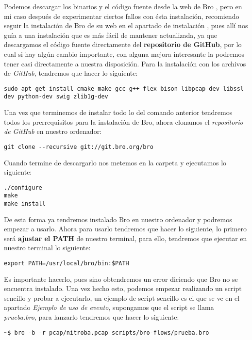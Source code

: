Podemos descargar los binarios y el código fuente desde la web de Bro \cite{brodownload}, 
pero en mi caso después de experimentar ciertos fallos con ésta instalación, 
recomiendo seguir la instalación de Bro de su web en el apartado de instalación \cite{broinstall}, 
pues allí nos guía a una instalación que es más fácil de mantener actualizada, 
ya que descargamos el código fuente directamente del \textbf{repositorio de GitHub}, 
por lo cual si hay algún cambio importante, con alguna mejora interesante 
la podremos tener casi directamente a nuestra disposición.
\intro
Para la instalación con los archivos de \textit{GitHub}, tendremos que hacer lo siguiente:
\intro
\begin{lstlisting}[style=Consola]
sudo apt-get install cmake make gcc g++ flex bison libpcap-dev libssl-dev python-dev swig zlib1g-dev
\end{lstlisting}

\noindent Una vez que terminemos de instalar todo lo del comando anterior tendremos todos los 
prerrequisitos para la instalación de Bro, ahora clonamos el 
\textit{repositorio de GitHub} en nuestro ordenador:
\intro
\begin{lstlisting}[style=Consola]
git clone --recursive git://git.bro.org/bro
\end{lstlisting}

\noindent Cuando termine de descargarlo nos metemos en la carpeta y ejecutamos lo siguiente:
\intro
\begin{lstlisting}[style=Consola]
./configure
make
make install
\end{lstlisting}

\noindent De esta forma ya tendremos instalado Bro en nuestro ordenador y podremos empezar 
a usarlo.
\intro
Ahora para usarlo tendremos que hacer lo siguiente, lo primero será \textbf{ajustar el 
PATH} de nuestro terminal, para ello, tendremos que ejecutar en nuestro terminal 
lo siguiente:
\intro
\begin{lstlisting}[style=Consola]
export PATH=/usr/local/bro/bin:$PATH
\end{lstlisting}

\noindent Es importante hacerlo, pues sino obtendremos un error diciendo que Bro no se 
encuentra instalado. Una vez hecho esto, podemos empezar realizando un script 
sencillo y probar a ejecutarlo, un ejemplo de script sencillo es el que se ve 
en el apartado \textit{Ejemplo  de uso de evento}, 
supongamos que el script se llama \textit{prueba.bro}, para lanzarlo tendremos 
que hacer lo siguiente:
\intro
\begin{lstlisting}[style=Consola]
~$ bro -b -r pcap/nitroba.pcap scripts/bro-flows/prueba.bro
\end{lstlisting}

